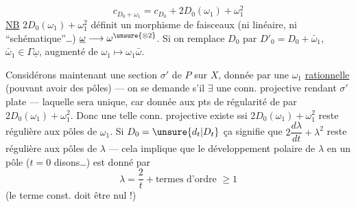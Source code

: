\[
c_{D_0+\omega_1}=c_{D_0}+2D_0(\omega_1)+\omega_1^2
\]
\uline{NB} \inserted{$\omega_1\longmapsto$} $2D_0(\omega_1)+\omega_1^2$ définit un morphisme de faisceaux (ni linéaire, ni ``schématique''\ldots) $\underline\omega\longrightarrow\omega^{\unsure{\otimes2}}$.
Si on remplace $D_0$ par $D'_0=D_0+\bar\omega_1$, $\bar\omega_1\in\Gamma\underline\omega$,  augmenté de $\omega_1\longmapsto\omega_1\bar\omega$.

Considérons maintenant une section $\sigma'$ de $P$ sur $X$, donnée  par une $\omega_1$ \uline{rationnelle} (pouvant avoir des pôles) --- on se demande s'il $\exists$ une conn. projective rendant $\sigma'$ plate --- laquelle sera unique, car donnée aux pts de régularité de  par $2D_0(\omega_1)+\omega_1^2$.
Donc une telle conn. projective existe ssi $2D_0(\omega_1)+\omega_1^2$ reste régulière aux pôles de $\omega_1$. Si $D_0=\unsure{d_t|D_t}$  ça signifie que $2\dfrac{d\lambda}{dt}+\lambda^2$ reste régulière aux pôles de $\lambda$ --- cela implique que le développement polaire de $\lambda$ en un pôle ($t=0$ disons\ldots) est donné par
\[
\lambda=\frac2t+\text{termes d'ordre }\geq1
\]
(le terme const. doit être nul !)
